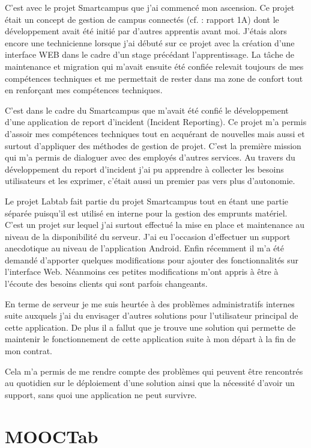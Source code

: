 \documentclass[french,12pt,a4paper,titlepage,openright,openbib]{report}
\begin{document}
C'est avec le projet Smartcampus que j'ai commencé mon ascension. Ce projet était un concept de gestion de campus connectés (cf. : rapport 1A) dont le développement avait été initié par d'autres apprentis avant moi. J'étais alors encore une technicienne lorsque j'ai débuté sur ce projet avec la création d'une interface WEB dans le cadre d'un stage précédant l'apprentissage.
La tâche de maintenance et migration qui m'avait ensuite été confiée relevait toujours de mes compétences techniques et me permettait de rester dans ma zone de confort tout en renforçant mes compétences techniques.

C'est dans le cadre du Smartcampus que m'avait été confié le développement d'une application de report d'incident (Incident Reporting). Ce projet m'a permis d'assoir mes compétences techniques tout en acquérant de nouvelles mais aussi et surtout d'appliquer des méthodes de gestion de projet. C'est la première mission qui m'a permis de dialoguer avec des employés d'autres services. Au travers du développement du report d'incident j'ai pu apprendre à collecter les besoins utilisateurs et les exprimer, c'était aussi un premier pas vers plus d'autonomie.

Le projet Labtab fait partie du projet Smartcampus tout en étant une partie séparée puisqu'il est utilisé en interne pour la gestion des emprunts matériel. C'est un projet sur lequel j'ai surtout effectué la mise en place et maintenance au niveau de la disponibilité du serveur.
J'ai eu l'occasion d'effectuer un support anecdotique au niveau de l'application Android. Enfin récemment il m'a été demandé d'apporter quelques modifications pour ajouter des fonctionnalités sur l'interface Web. Néanmoins ces petites modifications m'ont appris à être à l'écoute des besoins clients qui sont parfois changeants.

En terme de serveur je me suis heurtée à des problèmes administratifs internes suite auxquels j'ai du envisager d'autres solutions pour l'utilisateur principal de cette application. De plus il a fallut que je trouve une solution qui permette de maintenir le fonctionnement de cette application suite à mon départ à la fin de mon contrat. 

Cela m'a permis de me rendre compte des problèmes qui peuvent être rencontrés au quotidien sur le déploiement d'une solution ainsi que la nécessité d'avoir un support, sans quoi une application ne peut survivre.


\section{MOOCTab}
\end{document}

